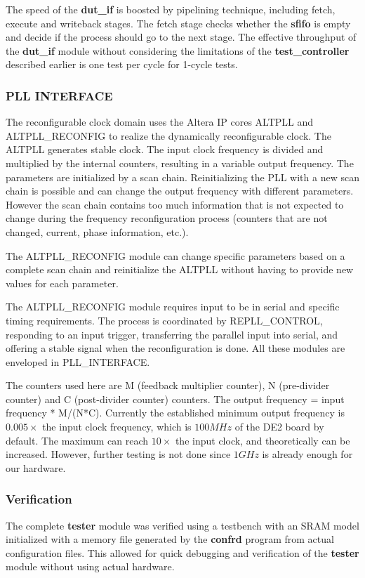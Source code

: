 The speed of the \textbf{dut\_if} is boosted by pipelining technique, including fetch, execute and writeback stages. The fetch stage checks whether the \textbf{sfifo} is empty and decide if the process should go to the next stage.
The effective throughput of the \textbf{dut\_if} module without considering the limitations of the \textbf{test\_controller} described earlier is one test per cycle for 1-cycle tests.

\subsubsection{PLL INTERFACE}
The reconfigurable clock domain uses the Altera IP cores ALTPLL and
\\
ALTPLL\_RECONFIG to realize the dynamically reconfigurable clock.
The ALTPLL generates stable clock. The input clock frequency is divided and multiplied by the internal counters,
resulting in a variable output frequency. The parameters are initialized by a scan chain.
Reinitializing the PLL with a new scan chain is possible and can change the output frequency with different parameters.
However the scan chain contains too much information that is not expected to change during the frequency reconfiguration process
(counters that are not changed, current, phase information, etc.).

The ALTPLL\_RECONFIG module can change specific parameters based on a complete scan chain and reinitialize the ALTPLL without having to provide new values for each parameter.

The ALTPLL\_RECONFIG module requires input to be in serial and specific timing requirements. The process is coordinated by REPLL\_CONTROL, responding to an input trigger, transferring the parallel input into serial, and offering a stable signal when the reconfiguration is done. All these modules are enveloped in PLL\_INTERFACE.

The counters used here are M (feedback multiplier counter), N (pre-divider counter) and C (post-divider counter) counters. The output frequency = input frequency * M/(N*C). Currently the established minimum output frequency is $0.005\times$ the input clock frequency, which is $100MHz$ of the DE2 board by default. The maximum can reach $10\times$ the input clock, and theoretically can be increased. However, further testing is not done since $1GHz$ is already enough for our hardware.


\subsubsection{Verification}
The complete \textbf{tester} module was verified using a testbench with an SRAM model initialized
with a memory file generated by the \textbf{confrd} program from actual configuration files. This allowed
for quick debugging and verification of the \textbf{tester} module without using actual hardware.


